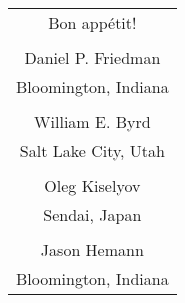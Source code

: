 \documentclass[uplatex, dvipdfmx, ja=standard, a6paper, 9pt]{bxjsarticle}
\begin{document}
\begin{table}[h]
  \begin{flushright}
    \begin{tabular}{c}
      Bon app\'etit! \\
      {}\\
      Daniel P. Friedman \\
      Bloomington, Indiana \\
      {}\\
      William E. Byrd \\
      Salt Lake City, Utah \\
      {}\\
      Oleg Kiselyov \\
      Sendai, Japan \\
      {}\\
      Jason Hemann \\
      Bloomington, Indiana \\
    \end{tabular}
  \end{flushright}
\end{table}

\nocite{*}
\printbibliography
\end{document}
